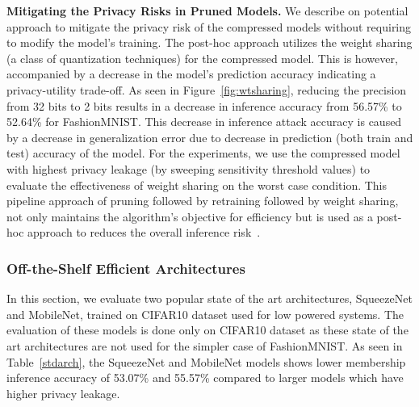 \textbf{Mitigating the Privacy Risks in Pruned Models.} We describe on potential approach to mitigate the privacy risk of the compressed models without requiring to modify the model's training.
The post-hoc approach utilizes the weight sharing (a class of quantization techniques) for the compressed model. This is however, accompanied by a decrease in the model's prediction accuracy indicating a privacy-utility trade-off.
As seen in Figure~\ref{fig:wtsharing}, reducing the precision from 32 bits to 2 bits results in a decrease in inference accuracy from 56.57\% to 52.64\% for FashionMNIST.
This decrease in inference attack accuracy is caused by a decrease in generalization error due to decrease in prediction (both train and test) accuracy of the model.
For the experiments, we use the compressed model with highest privacy leakage (by sweeping sensitivity threshold values) to evaluate the effectiveness of weight sharing on the worst case condition. %
This pipeline approach of pruning followed by retraining followed by weight sharing, not only maintains the algorithm's objective for efficiency but is used as a post-hoc approach to reduces the overall inference risk~\cite{DBLP:journals/corr/HanMD15,DBLP:journals/corr/HanPNMTECTD16}.






\subsubsection{Off-the-Shelf Efficient Architectures}



In this section, we evaluate two popular state of the art architectures, SqueezeNet and MobileNet, trained on CIFAR10 dataset used for low powered systems.
The evaluation of these models is done only on CIFAR10 dataset as these state of the art architectures are not used for the simpler case of FashionMNIST.
As seen in Table~\ref{stdarch}, the SqueezeNet and MobileNet models shows lower membership inference accuracy of 53.07\% and 55.57\% compared to larger models which have higher privacy leakage.


